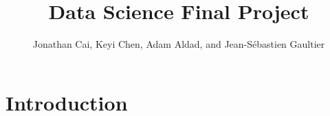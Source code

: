 \documentclass[12pt]{article}
\title{Data Science Final Project}
\author{Jonathan Cai, Keyi Chen, Adam Aldad, and Jean-Sébastien Gaultier}
\begin{document}
\maketitle

\section{Introduction}
\end{document}
